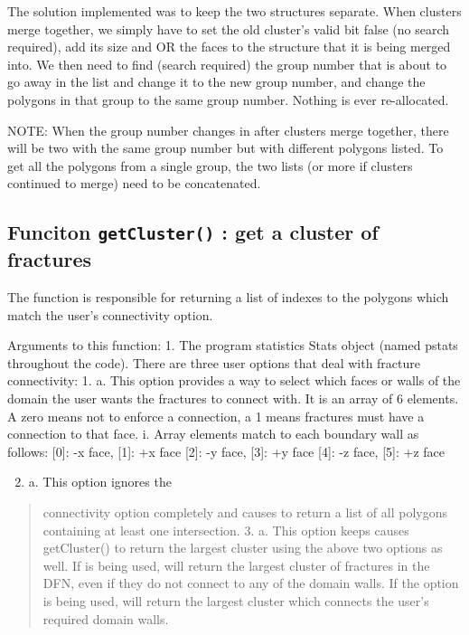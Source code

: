 \documentclass[letterpaper,10pt,english]{sphinxmanual}
\begin{document}
The solution implemented was to keep the two structures separate. When clusters
merge together, we simply have to set the old cluster’s  valid bit
false (no search required), add its size and OR the faces to the 
structure that it is being merged into. We then need to find (search required)
the group number that is about to go away in the  list and
change it to the new group number, and change the polygons in that group to the
same group number. Nothing is ever re-allocated.

NOTE: When the group number changes in  after clusters merge
together, there will be two  with the same group number but
with different polygons listed. To get all the polygons from a single group, the
two lists (or more if clusters continued to merge) need to be concatenated.


\subsection{Funciton  \texttt{getCluster()} : get a cluster of fractures}
\label{dfngen:funciton-getcluster-get-a-cluster-of-fractures}
The  function is responsible for returning a list of  indexes to
the polygons which match the user’s connectivity option.

Arguments to this function: 1. The program statistics Stats object (named pstats
throughout the code).  There are three user options that deal with fracture
connectivity: 1.         a.    This option provides a way to select
which faces or walls of the domain the user wants the fractures to connect with.
It is an array of 6 elements. A zero means not to enforce a connection, a 1
means fractures must have a connection to that face.  i.        Array elements match
to each boundary wall as follows: {[}0{]}: -x face, {[}1{]}: +x face {[}2{]}: -y face, {[}3{]}:
+y face {[}4{]}: -z face, {[}5{]}: +z face
\begin{enumerate}
\setcounter{enumi}{1}
\item {} 
 a.      This option ignores the 

\end{enumerate}
\begin{quote}

connectivity option completely and causes  to return a list
of all polygons containing at least one intersection.  3.
 a.        This option keeps causes getCluster() to
return the largest cluster using the above two options as well. If
 is being used,  will return the
largest cluster of fractures in the DFN, even if they do not connect to any
of the domain walls. If the  option is being used,
 will return the largest cluster which connects the user’s
required domain walls.
\end{quote}
\end{document}
